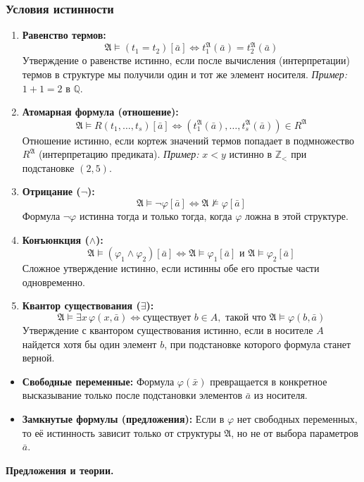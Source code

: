 \documentclass[12pt,a4paper,oneside,openany]{book}
\theoremstyle{definition}
\theoremstyle{plain}
\theoremstyle{remark}
\begin{document}
\subsubsection{Условия истинности}

\begin{enumerate}
    \item[\textbf{I.}] \textbf{Равенство термов:}
    \[ \mathfrak{A} \models (t_1 = t_2)[\bar{a}] \iff t_1^{\mathfrak{A}}(\bar{a}) = t_2^{\mathfrak{A}}(\bar{a}) \]
    Утверждение о равенстве истинно, если после вычисления (интерпретации) термов в структуре мы получили один и тот же элемент носителя.
    \textit{Пример:} $1 + 1 = 2$ в $\mathbb{Q}$.

    \item[\textbf{II.}] \textbf{Атомарная формула (отношение):}
    \[ \mathfrak{A} \models R(t_1, \dots, t_s)[\bar{a}] \iff (t_1^{\mathfrak{A}}(\bar{a}), \dots, t_s^{\mathfrak{A}}(\bar{a})) \in R^{\mathfrak{A}} \]
    Отношение истинно, если кортеж значений термов попадает в подмножество $R^{\mathfrak{A}}$ (интерпретацию предиката).
    \textit{Пример:} $x < y$ истинно в $\mathbb{Z}_{<}$ при подстановке $(2, 5)$.

    \item[\textbf{III.}] \textbf{Отрицание ($\neg$):}
    \[ \mathfrak{A} \models \neg \varphi[\bar{a}] \iff \mathfrak{A} \not\models \varphi[\bar{a}] \]
    Формула $\neg \varphi$ истинна тогда и только тогда, когда $\varphi$ ложна в этой структуре.

    \item[\textbf{IV.}] \textbf{Конъюнкция ($\wedge$):}
    \[ \mathfrak{A} \models (\varphi_1 \wedge \varphi_2)[\bar{a}] \iff \mathfrak{A} \models \varphi_1[\bar{a}] \text{ и } \mathfrak{A} \models \varphi_2[\bar{a}] \]
    Сложное утверждение истинно, если истинны обе его простые части одновременно.

    \item[\textbf{V.}] \textbf{Квантор существования ($\exists$):}
    \[ \mathfrak{A} \models \exists x \, \varphi(x, \bar{a}) \iff \text{существует } b \in A, \text{ такой что } \mathfrak{A} \models \varphi(b, \bar{a}) \]
    Утверждение с квантором существования истинно, если в носителе $A$ найдется хотя бы один элемент $b$, при подстановке которого формула станет верной.
\end{enumerate}

\begin{itemize}
    \item \textbf{Свободные переменные:} Формула $\varphi(\bar{x})$ превращается в конкретное высказывание только после подстановки элементов $\bar{a}$ из носителя.
    \item \textbf{Замкнутые формулы (предложения):} Если в $\varphi$ нет свободных переменных, то её истинность зависит только от структуры $\mathfrak{A}$, но не от выбора параметров $\bar{a}$.
\end{itemize}
\par\medskip
\textbf{Предложения и теории.}
\end{document}
